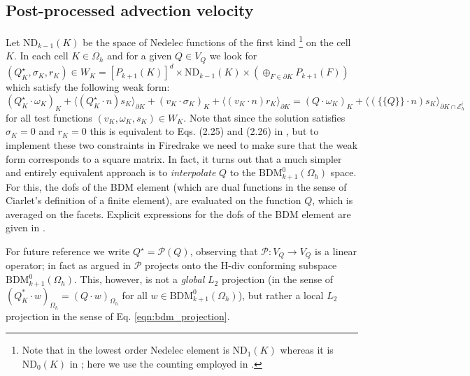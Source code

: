 \documentclass[11pt]{article}
\newcommand{\avg}[1]{\{\!\{#1\}\!\}}
\begin{document}
\subsection{Post-processed advection velocity}
Let $\text{ND}_{k-1}(K)$ be the space of Nedelec functions of the first kind \cite[Section 3.5.1]{Logg2012}\footnote{Note that in \cite{Logg2012} the lowest order Nedelec element is $\text{ND}_{1}(K)$ whereas it is $\text{ND}_{0}(K)$ in \cite{Guzman2016}; here we use the counting employed in \cite{Guzman2016}.} on the cell $K$. In each cell $K\in\Omega_h$ and for a given $Q\in V_Q$ we look for $(Q^\star_K,\sigma_K,r_K) \in W_K = [P_{k+1}(K)]^d\times \text{ND}_{k-1}(K)\times \left(\oplus_{F\in\partial K} P_{k+1}(F)\right)$ which satisfy the following weak form:
\begin{equation}
    (Q^\star_K\cdot  \omega_K)_K + \langle (Q_K^\star\cdot n)s_K\rangle_{\partial K} + (v_K\cdot \sigma_K)_K + \langle (v_K\cdot n)r_K\rangle_{\partial K} = (Q\cdot\omega_K)_K + \langle (\avg{Q}\cdot n)s_K\rangle_{\partial K\cap \mathcal{E}_h^i}\label{eqn:bdm_projection}
\end{equation}
for all test functions $(v_K,\omega_K,s_K)\in W_K$. Note that since the solution satisfies $\sigma_K=0$ and $r_K=0$ this is equivalent to Eqs. (2.25) and (2.26) in \cite{Guzman2016}, but to implement these two constraints in Firedrake we need to make sure that the weak form corresponds to a square matrix. In fact, it turns out that a much simpler and entirely equivalent approach is to \textit{interpolate} $Q$ to the $\text{BDM}^0_{k+1}(\Omega_h)$ space. For this, the dofs of the BDM element (which are dual functions in the sense of Ciarlet's definition \cite{Ciarlet2002} of a finite element), are evaluated on the function $Q$, which is  averaged on the facets. Explicit expressions for the dofs of the BDM element are given in \cite[Section 3.4.2, Definition 3.6]{Logg2012}.

For future reference we write $Q^\star = \mathcal{P}(Q)$, observing that $\mathcal{P}:V_Q \rightarrow V_Q$ is a linear operator; in fact as argued in \cite{Guzman2016} $\mathcal{P}$ projects onto the H-div conforming subspace $\text{BDM}^0_{k+1}(\Omega_h)$. This, however, is not a \textit{global} $L_2$ projection (in the sense of $(Q_K^*\cdot w)_{\Omega_h} = (Q\cdot w)_{\Omega_h}$ for all $w\in \text{BDM}^0_{k+1}(\Omega_h)$), but rather a local $L_2$ projection in the sense of Eq. \eqref{eqn:bdm_projection}.
\end{document}
